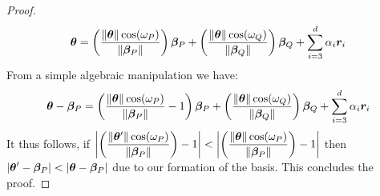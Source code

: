 \documentclass{article} %
\newcommand{\norm}[1]{\left\lVert#1\right\rVert}
\begin{document}
\begin{appendices}
\begin{proof}
\begin{equation}
			\vtheta = \left(\frac{\norm{\vtheta}\cos(\omega_P)}{\norm{\vbeta_P}}\right) \vbeta_P + \left(\frac{\norm{\vtheta}\cos(\omega_Q)}{\norm{\vbeta_Q}}\right) \vbeta_Q + \sum_{i=3}^d\alpha_i\vr_i 
		\end{equation}
		From a simple algebraic manipulation we have:
		\begin{equation}
			\vtheta - \vbeta_P = \left(\frac{\norm{\vtheta}\cos(\omega_P)}{\norm{\vbeta_P}} - 1\right) \vbeta_P + \left(\frac{\norm{\vtheta}\cos(\omega_Q)}{\norm{\vbeta_Q}}\right) \vbeta_Q + \sum_{i=3}^d\alpha_i\vr_i 
		\end{equation}
		It thus follows, if $\displaystyle \left|\left(\frac{\norm{\vtheta'}\cos(\omega_P)}{\norm{\vbeta_P}}\right)-1\right| < \left|\left(\frac{\norm{\vtheta}\cos(\omega_P)}{\norm{\vbeta_P}}\right)-1\right|$ then $\displaystyle |{\bm{\theta}}' - {\bm{\beta}}_P| < |{\bm{\theta}} - {\bm{\beta}}_P|$ due to our formation of the basis. This concludes the proof. 
	\end{proof}


\end{appendices}
\end{document}
